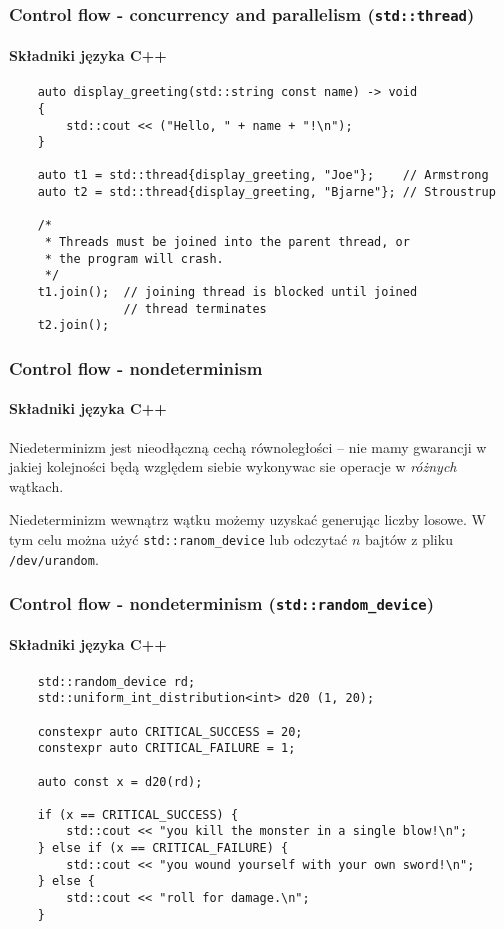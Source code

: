 \documentclass[aspectratio=169]{beamer}
\begin{document}
\begin{frame}[fragile]
    \frametitle{Control flow - concurrency and parallelism ({\tt std::thread})}
    \framesubtitle{Składniki języka C++}

    {\footnotesize
    \begin{lstlisting}
    auto display_greeting(std::string const name) -> void
    {
        std::cout << ("Hello, " + name + "!\n");
    }

    auto t1 = std::thread{display_greeting, "Joe"};    // Armstrong
    auto t2 = std::thread{display_greeting, "Bjarne"}; // Stroustrup

    /*
     * Threads must be joined into the parent thread, or
     * the program will crash.
     */
    t1.join();  // joining thread is blocked until joined
                // thread terminates
    t2.join();
    \end{lstlisting}}
\end{frame}

\begin{frame}
    \frametitle{Control flow - nondeterminism}
    \framesubtitle{Składniki języka C++}

    Niedeterminizm jest nieodłączną cechą równoległości -- nie mamy gwarancji w
    jakiej kolejności będą względem siebie wykonywac sie operacje w
    \emph{różnych} wątkach.

    \vspace{1em}

    Niedeterminizm wewnątrz wątku możemy uzyskać generując liczby losowe. W tym
    celu można użyć {\tt std::ranom\_device} lub odczytać $n$ bajtów z pliku
    {\tt /dev/urandom}.
\end{frame}

\begin{frame}[fragile]
    \frametitle{Control flow - nondeterminism ({\tt std::random\_device})}
    \framesubtitle{Składniki języka C++}

    {\footnotesize
    \begin{lstlisting}
    std::random_device rd;
    std::uniform_int_distribution<int> d20 (1, 20);

    constexpr auto CRITICAL_SUCCESS = 20;
    constexpr auto CRITICAL_FAILURE = 1;

    auto const x = d20(rd);

    if (x == CRITICAL_SUCCESS) {
        std::cout << "you kill the monster in a single blow!\n";
    } else if (x == CRITICAL_FAILURE) {
        std::cout << "you wound yourself with your own sword!\n";
    } else {
        std::cout << "roll for damage.\n";
    }
    \end{lstlisting}}
\end{frame}
\end{document}

